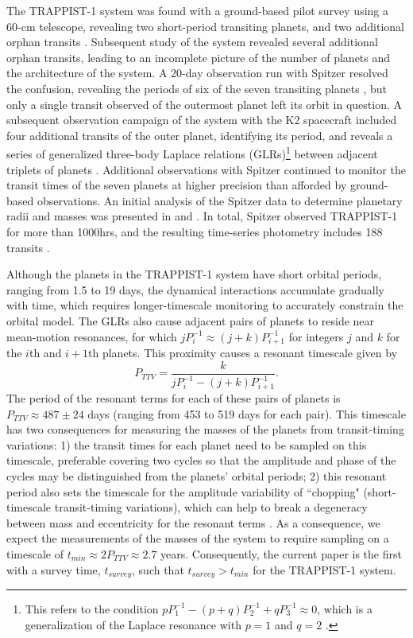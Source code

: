 \documentclass[twocolumn]{aastex63}
\begin{document}
The TRAPPIST-1 system was found with a ground-based pilot survey using a 60-cm telescope,
revealing two short-period transiting planets, and two additional orphan transits
\citep{Gillon2016, Burdanov2018}.  Subsequent study of the system revealed several
additional orphan transits, leading to an incomplete picture of the number of planets
and the architecture of the system.  A 20-day observation run with Spitzer resolved the
confusion, revealing the periods of six of the seven transiting planets \citep{Gillon2017},
but only a single transit observed of the outermost planet left its orbit in question.
A subsequent observation campaign of the system with the K2 spacecraft included four
additional transits of the outer planet, identifying its period, and reveals a series
of generalized three-body Laplace relations (GLRs)\footnote{This refers to the condition
$pP_1^{-1}-(p+q)P_2^{-1}+qP_3^{-1} \approx 0$, which is a generalization of the Laplace
resonance with $p=1$ and $q=2$ \citep{Papaloizou2014}. } between adjacent triplets of
planets \citep{Luger2017a}.  Additional observations with Spitzer
continued to monitor the transit times of the seven planets at higher precision than
afforded by ground-based observations. An initial analysis of the Spitzer data to determine
planetary radii and masses was presented in \citet{Delrez2018a} and \citet{Grimm2018}. In total,
Spitzer observed TRAPPIST-1 for more than 1000hrs, and the resulting time-series photometry
includes 188 transits \citep{Ducrot2020}.

Although the planets in the TRAPPIST-1 system have short orbital periods, ranging from
1.5 to 19 days, the dynamical interactions accumulate gradually with time, which requires
longer-timescale monitoring to accurately constrain the orbital model.
The GLRs also cause adjacent pairs of planets to reside near mean-motion resonances,
for which $j P_i^{-1} \approx (j+k) P_{i+1}^{-1}$ for integers $j$ and $k$ for the $i$th and $i+1$th planets.  This proximity causes a resonant timescale
given by
\begin{equation}
    P_{TTV} = \frac{k}{j P_i^{-1} - (j+k) P_{i+1}^{-1}}.
\end{equation}
The period of the resonant terms for each of these pairs of planets is $P_{TTV} \approx 487\pm 24$
days (ranging from 453 to 519 days for each pair).  This timescale has two consequences for
measuring the masses of the planets from transit-timing variations:  1)  the transit times
for each planet need to be sampled on this timescale, preferable covering two cycles so that
the amplitude and phase of the cycles may be distinguished from the planets' orbital periods;
2) this resonant period also sets the timescale for the amplitude variability of ``chopping" (short-timescale
transit-timing variations), which can help to break a degeneracy between mass and eccentricity for the resonant terms
\citep{Lithwick2012,Deck2015}.  As a consequence, we expect the measurements of the masses
of the system to require sampling on a timescale of $t_{min} \approx 2 P_{TTV} \approx 2.7$ years.
Consequently, the current paper is the first with a survey time, $t_{survey}$, such that $t_{survey} {>} t_{min}$ for the TRAPPIST-1 system.
\end{document}
